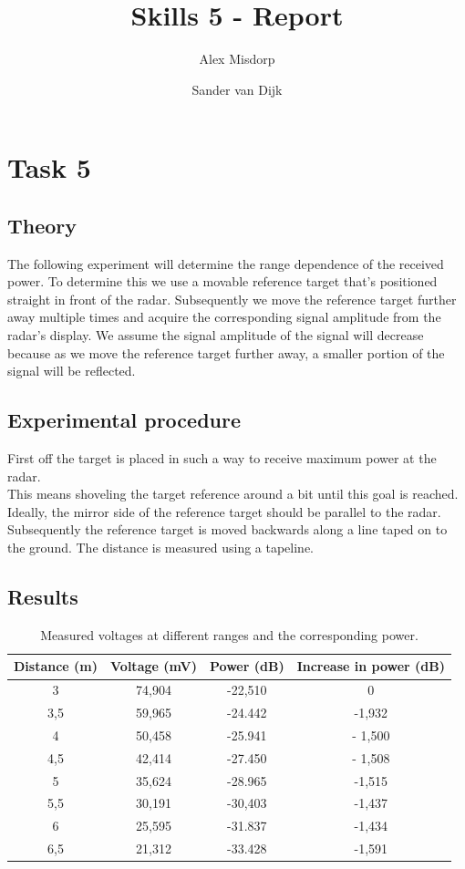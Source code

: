\documentclass[final]{scrreprt} %
\title{Skills 5 - Report}
\author{Alex {Misdorp} \and Sander {van Dijk}}
\begin{document}
\chapter*{Task 5}
\section*{Theory}
The following experiment will determine the range dependence of the received power. 
To determine this we use a movable reference target that's positioned straight in front of the radar. 
Subsequently we move the reference target further away multiple times and acquire the corresponding signal amplitude from the radar's display.
We assume the signal amplitude of the signal will decrease because as we move the reference target further away, a smaller portion of the signal will be reflected.

\section*{Experimental procedure}
First off the target is placed in such a way to receive maximum power at the radar.\\
This means shoveling the target reference around a bit until this goal is reached.\\
Ideally, the mirror side of the reference target should be parallel to the radar.\\
Subsequently the reference target is moved backwards along a line taped on to the ground.
The distance is measured using a tapeline.

\section*{Results}
\begin{table}[H]
\begin{center}
\begin{tabular}{|c | c | c | c|}
\hline
Distance (m) & Voltage (mV) & Power (dB) & Increase in power (dB)\\
\hline
3 & 74,904 & -22,510 & 0\\
\hline
3,5 & 59,965 & -24.442 & -1,932\\
\hline
4 & 50,458 &  -25.941 & - 1,500\\
\hline
4,5 & 42,414 & -27.450 & - 1,508\\
\hline
5 & 35,624 & -28.965 & -1,515\\
\hline
5,5 & 30,191 & -30,403 & -1,437\\
\hline
6 & 25,595 & -31.837 & -1,434\\
\hline
6,5 & 21,312 & -33.428 & -1,591\\
\hline
\end{tabular}
\caption{Measured voltages at different ranges and the corresponding power.}
\label{tab:receivedpower}
\end{center}
\end{table}
\end{document}
